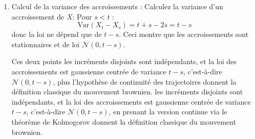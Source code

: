 \begin{parts}
\begin{xsolution}
\begin{enumerate}
       En utilisant la propriété ${\rm Cov}(X_s,X_t)=\inf(s,t).$
       Calculer $\text{Cov}(X_t - X_s, X_v - X_u)$
       Pour \(s < t \leq u < v\) :
       \[
       \text{Cov}(X_t - X_s, X_v - X_u) = \min(t,v) - \min(t,u) - \min(s,v) + \min(s,u)
       \]
       Ceci donne systématiquement 0, prouvant que 
       les accroissements disjoints sont non corrélés, donc indépendants 
       (car vecteur gaussien).
    \item Calcul de la variance des accroissements :  
       Calculez la variance d'un accroissement de $X$:
       Pour \(s < t\) :
       \[
       \text{Var}(X_t - X_s) = t + s - 2s = t - s
       \]
       donc la loi ne dépend que de \(t-s\).
       Ceci montre que les accroissements sont stationnaires et 
       de loi \(\mathcal{N}(0, t-s)\).
    
    Ces deux points 
    les incréments disjoints sont indépendants, et 
    la loi des accroissements est gaussienne centrée de variance $t-s$, c'est-à-dire \(\mathcal{N}(0, t-s)\),
    plus l'hypothèse de continuité des trajectoires 
    donnent 
    la définition classique du mouvement brownien.
    les incréments disjoints sont indépendants, et 
    la loi des accroissements est gaussienne centrée de variance $t-s$, c'est-à-dire \(\mathcal{N}(0, t-s)\),
    en prenant la version continue via le théorème de Kolmogorov
    donnent 
    la définition classique du mouvement brownien.
    \end{enumerate}
    \end{xsolution}


\end{parts}

